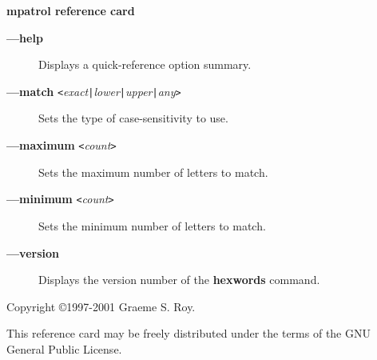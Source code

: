 \documentclass[a4paper,landscape,final]{article}
\newcommand{\command}[1]{\textbf{#1}}
\newcommand{\flag}[1]{\textbf{---#1}}
\newcommand{\flagpar}[2]{\flag{#1} \texttt{<}\textit{#2}\texttt{>}}
\begin{document}
\begin{multicols}{3}{\textbf{\Large mpatrol reference card}}
\begin{description}
\item[\flag{help}]
Displays a quick-reference option summary.
\item[\flagpar{match}{exact\texttt{|}lower\texttt{|}upper\texttt{|}any}]
Sets the type of case-sensitivity to use.
\item[\flagpar{maximum}{count}]
Sets the maximum number of letters to match.
\item[\flagpar{minimum}{count}]
Sets the minimum number of letters to match.
\item[\flag{version}]
Displays the version number of the \command{hexwords} command.
\end{description}

\vskip 12pt
Copyright \copyright 1997-2001 Graeme S. Roy.
\vskip 6pt

This reference card may be freely distributed under the terms of the GNU General
Public License.

\end{multicols}
\end{document}
